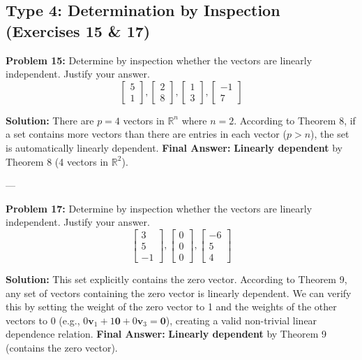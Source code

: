 \documentclass[11pt]{article}
\begin{document}
\subsection{Type 4: Determination by Inspection (Exercises 15 \& 17)}

\textbf{Problem 15:} Determine by inspection whether the vectors are linearly independent. Justify your answer.
\[ \begin{bmatrix} 5 \\ 1 \end{bmatrix}, \begin{bmatrix} 2 \\ 8 \end{bmatrix}, \begin{bmatrix} 1 \\ 3 \end{bmatrix}, \begin{bmatrix} -1 \\ 7 \end{bmatrix} \]

\textbf{Solution:}
There are $p = 4$ vectors in $\mathbb{R}^n$ where $n = 2$. According to Theorem 8, if a set contains more vectors than there are entries in each vector ($p > n$), the set is automatically linearly dependent.
\textbf{Final Answer:} \textbf{Linearly dependent} by Theorem 8 (4 vectors in $\mathbb{R}^2$).

---

\textbf{Problem 17:} Determine by inspection whether the vectors are linearly independent. Justify your answer.
\[ \begin{bmatrix} 3 \\ 5 \\ -1 \end{bmatrix}, \begin{bmatrix} 0 \\ 0 \\ 0 \end{bmatrix}, \begin{bmatrix} -6 \\ 5 \\ 4 \end{bmatrix} \]

\textbf{Solution:}
This set explicitly contains the zero vector. According to Theorem 9, any set of vectors containing the zero vector is linearly dependent. We can verify this by setting the weight of the zero vector to 1 and the weights of the other vectors to 0 (e.g., $0\mathbf{v}_1 + 1\mathbf{0} + 0\mathbf{v}_3 = \mathbf{0}$), creating a valid non-trivial linear dependence relation.
\textbf{Final Answer:} \textbf{Linearly dependent} by Theorem 9 (contains the zero vector).
\end{document}
